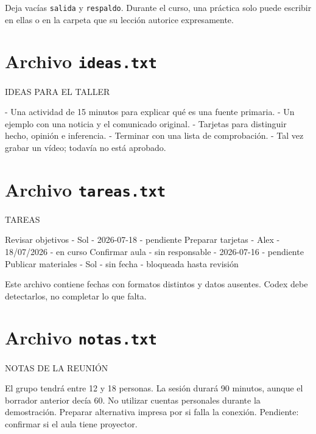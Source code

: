 \documentclass[10pt,a4paper,openany]{book}
\newenvironment{Shaded}{}{}
\newcommand{\NormalTok}[1]{#1}
\renewenvironment{Shaded}
  {\begin{tcolorbox}[
    enhanced,
    breakable,
    colback=CodeBg,
    colframe=Border,
    boxrule=0.5pt,
    arc=2mm,
    left=3mm,
    right=3mm,
    top=2.2mm,
    bottom=2.2mm,
    before skip=0.8em,
    after skip=0.9em
  ]}
  {\end{tcolorbox}}
\begin{document}
Deja vacías \texttt{salida} y \texttt{respaldo}. Durante el curso, una
práctica solo puede escribir en ellas o en la carpeta que su lección
autorice expresamente.

\section{\texorpdfstring{Archivo
\texttt{ideas.txt}}{Archivo ideas.txt}}\label{archivo-ideas.txt}

\begin{Shaded}
\begin{Highlighting}[]
\NormalTok{IDEAS PARA EL TALLER}

\NormalTok{{-} Una actividad de 15 minutos para explicar qué es una fuente primaria.}
\NormalTok{{-} Un ejemplo con una noticia y el comunicado original.}
\NormalTok{{-} Tarjetas para distinguir hecho, opinión e inferencia.}
\NormalTok{{-} Terminar con una lista de comprobación.}
\NormalTok{{-} Tal vez grabar un vídeo; todavía no está aprobado.}
\end{Highlighting}
\end{Shaded}

\section{\texorpdfstring{Archivo
\texttt{tareas.txt}}{Archivo tareas.txt}}\label{archivo-tareas.txt}

\begin{Shaded}
\begin{Highlighting}[]
\NormalTok{TAREAS}

\NormalTok{Revisar objetivos {-} Sol {-} 2026{-}07{-}18 {-} pendiente}
\NormalTok{Preparar tarjetas {-} Alex {-} 18/07/2026 {-} en curso}
\NormalTok{Confirmar aula {-} sin responsable {-} 2026{-}07{-}16 {-} pendiente}
\NormalTok{Publicar materiales {-} Sol {-} sin fecha {-} bloqueada hasta revisión}
\end{Highlighting}
\end{Shaded}

Este archivo contiene fechas con formatos distintos y datos ausentes.
Codex debe detectarlos, no completar lo que falta.

\section{\texorpdfstring{Archivo
\texttt{notas.txt}}{Archivo notas.txt}}\label{archivo-notas.txt}

\begin{Shaded}
\begin{Highlighting}[]
\NormalTok{NOTAS DE LA REUNIÓN}

\NormalTok{El grupo tendrá entre 12 y 18 personas.}
\NormalTok{La sesión durará 90 minutos, aunque el borrador anterior decía 60.}
\NormalTok{No utilizar cuentas personales durante la demostración.}
\NormalTok{Preparar alternativa impresa por si falla la conexión.}
\NormalTok{Pendiente: confirmar si el aula tiene proyector.}
\end{Highlighting}
\end{Shaded}
\end{document}
